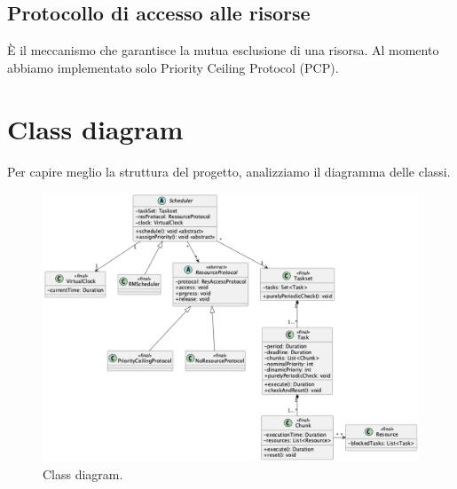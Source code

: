 \subsection{Protocollo di accesso alle risorse}
È il meccanismo che garantisce la mutua esclusione di una risorsa. Al momento abbiamo implementato solo Priority Ceiling Protocol (PCP).

\section{Class diagram}
Per capire meglio la struttura del progetto, analizziamo il diagramma delle classi.
\begin{figure}[htbp]
    \centering
    \includegraphics[width=1\textwidth]{immagini/class diagram.pdf}
    \caption{Class diagram.}
\end{figure}